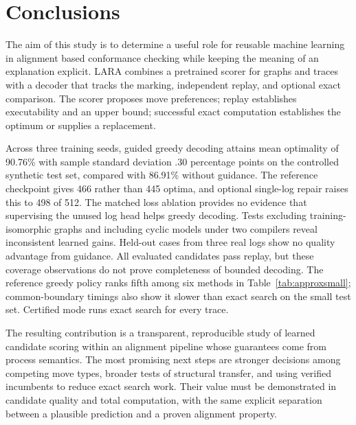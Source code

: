 \section{Conclusions}
\label{sec:conclusion}

The aim of this study is to determine a useful role for reusable machine learning in alignment based conformance checking while keeping the meaning of an explanation explicit. LARA combines a pretrained scorer for graphs and traces with a decoder that tracks the marking, independent replay, and optional exact comparison. The scorer proposes move preferences; replay establishes executability and an upper bound; successful exact computation establishes the optimum or supplies a replacement.

\begin{revised}Across three training seeds, guided greedy decoding attains mean optimality of 90.76\% with sample standard deviation .30 percentage points on the controlled synthetic test set, compared with 86.91\% without guidance. The reference checkpoint gives 466 rather than 445 optima, and optional single-log repair raises this to 498 of 512. The matched loss ablation provides no evidence that supervising the unused log head helps greedy decoding. Tests excluding training-isomorphic graphs and including cyclic models under two compilers reveal inconsistent learned gains. Held-out cases from three real logs show no quality advantage from guidance. All evaluated candidates pass replay, but these coverage observations do not prove completeness of bounded decoding. The reference greedy policy ranks fifth among six methods in Table~\ref{tab:approxsmall}; common-boundary timings also show it slower than exact search on the small test set. Certified mode runs exact search for every trace.\end{revised}

The resulting contribution is a transparent, reproducible study of learned candidate scoring within an alignment pipeline whose guarantees come from process semantics. The most promising next steps are stronger decisions among competing move types, broader tests of structural transfer, and using verified incumbents to reduce exact search work. Their value must be demonstrated in candidate quality and total computation, with the same explicit separation between a plausible prediction and a proven alignment property.
